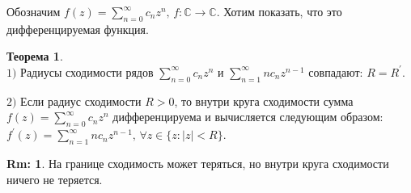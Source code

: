 \documentclass[12pt]{article}
\newcommand{\MC}{\mathbb{C}}
\theoremstyle{definition}
\newtheorem{rem}{Rm:}
\newtheorem{theorem}{Теорема}
\newcommand{\ddsum}[2]{\displaystyle\sum\limits_{#1}^{#2}}
\begin{document}
Обозначим $f(z) = \ddsum{n = 0}{\infty}c_n z^n, \, f \colon \MC \to \MC$. Хотим показать, что это дифференцируемая функция.

\begin{theorem}\hfill\\
	$1)$ Радиусы сходимости рядов $\ddsum{n = 0}{\infty}c_n z^n$ и $\ddsum{n = 1}{\infty}n c_n z^{n-1}$ совпадают: $R = R^\prime$.
	
	$2)$ Если радиус сходимости $R > 0$, то внутри круга сходимости сумма $f(z) = \ddsum{n = 0}{\infty}c_n z^n$  дифференцируема и вычисляется следующим образом: $f^\prime(z) = \ddsum{n = 1}{\infty}nc_n z^{n-1}, \, \forall z \in \{z \colon |z| < R\}$.
\end{theorem}
\begin{rem}
	На границе сходимость может теряться, но внутри круга сходимости ничего не теряется.
\end{rem}
\end{document}
